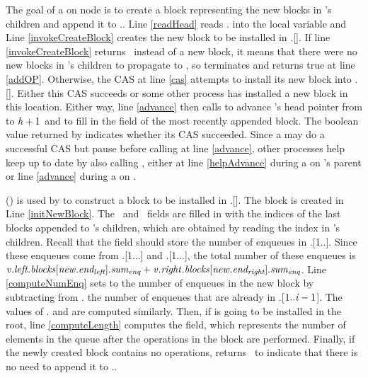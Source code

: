 The goal of a  on node  is to create a block representing the new blocks
in 's
children and append it to .. 
Line \ref{readHead} reads . into the local variable 
and Line \ref{invokeCreateBlock} creates the new block to be installed in .[].
If line \ref{invokeCreateBlock} returns \nl\ instead of a new block, it means that there were no new blocks in 's children to propagate to ,
so  terminates and returns true at line \ref{addOP}.
Otherwise, the CAS at line \ref{cas} attempts to install its new block into .[].
Either this CAS succeeds or some other process has installed a new block in this location.
Either way, line \ref{advance} then calls  to advance 's head pointer 
from  to $\mbox{\textnormal{\textit{h}}}+1$
and to fill in the  field of the most recently appended block.
The boolean value returned by  indicates whether its CAS succeeded.
Since a  may do a successful CAS but pause before calling  at line \ref{advance},
other processes help keep  up to date by also calling , 
either at line \ref{helpAdvance} during a  on 's parent or line \ref{advance} during a  on .

() is used
by  to construct a block to be installed in .[].
The block  is created in Line \ref{initNewBlock}. 
The \eleft\ and \eright\ fields are filled in with the indices of the last blocks appended to 's
children, which are obtained by reading the  index in 's children.
Recall that the  field should store the number of enqueues in
.[1..].
Since these enqueues come from .[1...\eleft] and .[1...\eright],
the total number of these enqueues is $\mbox{\textnormal{\textit{v}}}.\mbox{\textit{left.blocks}}[\mbox{\textnormal{\textit{new}}}.\mbox{\textit{end\textsubscript{left}}}].\mbox{\textit{sum\textsubscript{enq}}} + \mbox{\textnormal{\textit{v}}}.\mbox{\textit{right}}.\mbox{\textit{blocks}}[\mbox{\textnormal{\textit{new}}}.\mbox{\textit{end\textsubscript{right}}}].\mbox{\textit{sum\textsubscript{enq}}}$.
Line \ref{computeNumEnq} sets  to the number of enqueues in the new block by
subtracting from . the number of enqueues that are already in .[$1..\mbox{\textnormal{\textit{i}}}-1$].
The values of . and  are computed similarly.
Then, if 
is going to be installed in the root, line \ref{computeLength} computes the  field, which
represents the number of elements in the queue after the operations in the block are performed.
Finally, if the newly created block contains no operations,  returns \nl\ to indicate
that there is no need to append it to ..

